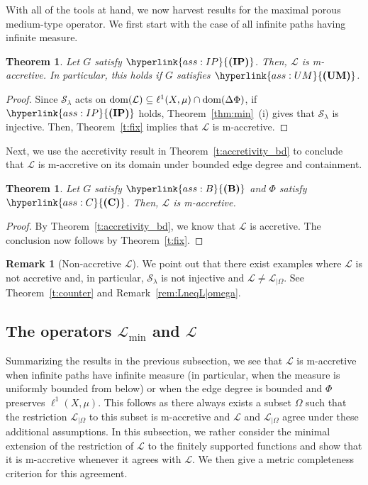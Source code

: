 \documentclass[letterpaper]{article}
\newtheorem{theorem}[lemma]{Theorem}
\theoremstyle{definition}
\newtheorem{remark}[lemma]{Remark}
\theoremstyle{named}
\numberwithin{equation}{section}
\newcommand{\IP}{\hyperlink{ass:IP}{\textup{\textbf{(IP)}}}}
\newcommand{\UM}{\hyperlink{ass:UM}{\textup{\textbf{(UM)}}}}
\newcommand{\B}{\hyperlink{ass:B}{\textup{\textbf{(B)}}}}
\newcommand{\C}{\hyperlink{ass:C}{\textup{\textbf{(C)}}}}
\newcommand{\dom}{\textnormal{dom}} %
\newcommand{\Deltaphi}{\mathcal{L}}
\newcommand{\deltaphim}{\mathcal{L}_{\min}}
\newcommand{\Deltaphiom}{\Deltaphi_{|\Omega}}
\begin{document}
With all of the tools at hand, we now harvest results for the maximal
porous medium-type operator. We first start with the case of all infinite
paths having infinite measure.

\begin{theorem}\label{t:lf}
Let $G$ satisfy $\IP$. Then,  $\Deltaphi$  
is m-accretive. In particular, this holds if $G$ satisfies $\UM$.
\end{theorem}
\begin{proof}
Since $\mathcal{S}_\lambda$ acts on
$\dom(\Deltaphi) \subseteq \ell^1(X,\mu)\cap \dom(\Delta \Phi)$, 
if $\IP$ holds, Theorem~\ref{thm:min}~(i) gives that
$\mathcal{S}_\lambda$ is injective. Then, Theorem~\ref{t:fix} implies
that $\Deltaphi$ is m-accretive.
\end{proof}


Next, we use the accretivity result in 
Theorem~\ref{t:accretivity_bd} to conclude that $\Deltaphi$ is m-accretive
on its  domain under bounded edge degree and containment.  
\begin{theorem}\label{t:accretive_bd}
Let $G$ satisfy $\B$ and $\Phi$ satisfy $\C$. Then, 
$\Deltaphi$ is m-accretive.
\end{theorem}
\begin{proof}
By Theorem~\ref{t:accretivity_bd}, we know that $\Deltaphi$ is accretive.
The conclusion now follows by Theorem~\ref{t:fix}.
\end{proof}



\begin{remark}[Non-accretive $\Deltaphi$]
    We point out that there exist examples where $\Deltaphi$ is not accretive and, in particular, 
    $\mathcal{S}_{\lambda}$ is not injective and
    $\Deltaphi \neq \Deltaphiom$. See Theorem~\ref{t:counter} and Remark~\ref{rem:LneqL|omega}. 
\end{remark}



\subsection{\texorpdfstring{The operators $\deltaphim$ and $\Deltaphi$}{The operators Delta Phi min and Delta Phi}}
Summarizing the results in the previous subsection, we see that $\Deltaphi$ is 
m-accretive when infinite paths 
have infinite measure (in particular, when the measure is uniformly bounded from 
below) or when the edge degree is bounded and $\Phi$ preserves $\ell^1(X,\mu)$.
This follows as there always exists a subset $\Omega$ such that the restriction 
$\Deltaphiom$ to this subset is m-accretive 
and $\Deltaphi$ and $\Deltaphiom$
agree under these additional assumptions.
In this subsection, we rather consider the minimal extension
of the restriction of $\Deltaphi$ to the finitely supported 
functions and show that it is m-accretive whenever
it agrees with $\Deltaphi$. We then give a metric
completeness criterion for this agreement.
\end{document}
